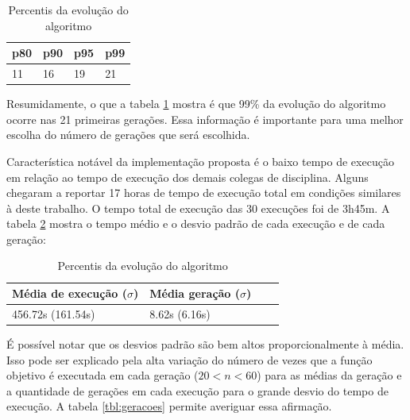 \documentclass[11pt]{article}
\begin{document}
\begin{table}[H]
    \centering
    \caption{Percentis da evolução do algoritmo}
    \label{tbl:percentis}
    \begin{tabular}{|l|l|l|l|}
    \hline
    p80 & p90 & p95 & p99 \\ \hline
    11  & 16  & 19  & 21  \\ \hline
    \end{tabular}
\end{table}

Resumidamente, o que a tabela \ref{tbl:percentis} mostra é que 99\% da evolução
do algoritmo ocorre nas 21 primeiras gerações. Essa informação é importante
para uma melhor escolha do número de gerações que será escolhida.

Característica notável da implementação proposta é o baixo tempo de execução em
relação ao tempo de execução dos demais colegas de disciplina. Alguns chegaram
a reportar 17 horas de tempo de execução total em condições similares à deste
trabalho. O tempo total de execução das 30 execuções foi de 3h45m. A tabela
\ref{tbl:tempo} mostra o tempo médio e o desvio padrão de cada execução e de
cada geração:

\begin{table}[H]
    \centering
    \caption{Percentis da evolução do algoritmo}
    \label{tbl:tempo}
    \begin{tabular}{|l|l|l|l|}
    \hline
    Média de execução ($\sigma$) & Média geração ($\sigma$) \\ \hline
    456.72s (161.54s)            & 8.62s (6.16s)             \\ \hline
    \end{tabular}
\end{table}

É possível notar que os desvios padrão são bem altos proporcionalmente à média.
Isso pode ser explicado pela alta variação do número de vezes que a função
objetivo é executada em cada geração ($20 < n < 60$) para as médias da geração
e a quantidade de gerações em cada execução para o grande desvio do tempo de
execução. A tabela \ref{tbl:geracoes} permite averiguar essa afirmação.
\end{document}
